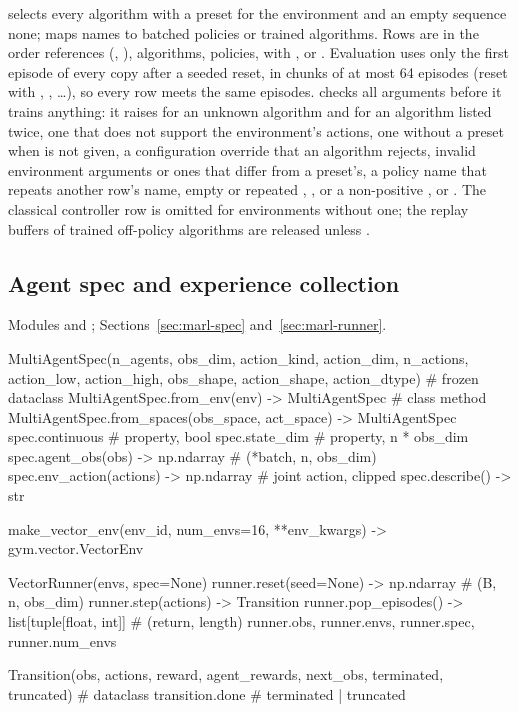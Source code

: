  selects every algorithm with a preset for the
environment and an empty sequence none;  maps names to batched
policies or trained algorithms. Rows are in the order references
(, ), algorithms, policies, with
 ,  or .
Evaluation uses only the first episode of every copy after a seeded reset,
in chunks of at most 64 episodes (reset with ,
, \ldots), so every row meets the same episodes.
 checks all arguments before it trains anything: it raises
 for an unknown algorithm and  for an
algorithm listed twice, one that does not support the environment's actions,
one without a preset when  is not given, a configuration
override that an algorithm rejects, invalid environment arguments or ones that
differ from a preset's, a policy name that repeats another row's name, empty or
repeated , , or a non-positive
,  or . The classical
controller row is omitted for environments without one; the replay buffers of
trained off-policy algorithms are released unless .

\subsection{Agent spec and experience collection}

Modules  and ;
Sections~\ref{sec:marl-spec} and~\ref{sec:marl-runner}.

\begin{pycode}
MultiAgentSpec(n_agents, obs_dim, action_kind, action_dim, n_actions,
               action_low, action_high, obs_shape, action_shape,
               action_dtype)                          # frozen dataclass
MultiAgentSpec.from_env(env) -> MultiAgentSpec        # class method
MultiAgentSpec.from_spaces(obs_space, act_space) -> MultiAgentSpec
spec.continuous                                       # property, bool
spec.state_dim                                        # property, n * obs_dim
spec.agent_obs(obs) -> np.ndarray                     # (*batch, n, obs_dim)
spec.env_action(actions) -> np.ndarray                # joint action, clipped
spec.describe() -> str

make_vector_env(env_id, num_envs=16, **env_kwargs) -> gym.vector.VectorEnv

VectorRunner(envs, spec=None)
runner.reset(seed=None) -> np.ndarray                 # (B, n, obs_dim)
runner.step(actions) -> Transition
runner.pop_episodes() -> list[tuple[float, int]]      # (return, length)
runner.obs, runner.envs, runner.spec, runner.num_envs

Transition(obs, actions, reward, agent_rewards, next_obs, terminated,
           truncated)                                 # dataclass
transition.done                                       # terminated | truncated
\end{pycode}

